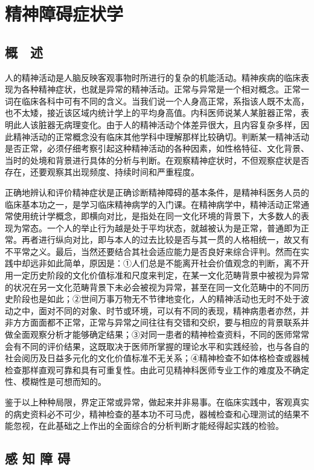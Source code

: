 \chapter{精神障碍症状学}

\section{概　述}

人的精神活动是人脑反映客观事物时所进行的复杂的机能活动。精神疾病的临床表现为各种精神症状，也就是异常的精神活动。正常与异常是一个相对概念。正常一词在临床各科中可有不同的含义。当我们说一个人身高正常，系指该人既不太高，也不太矮，接近该区域内统计学上的平均身高值。内科医师说某人某脏器正常，表明此人该脏器无病理变化。由于人的精神活动个体差异很大，且内容复杂多样，因此精神活动的正常概念没有临床其他学科中理解那样比较确切。判断某一精神活动是否正常，必须仔细考察引起这种精神活动的各种因素，如性格特征、文化背景、当时的处境和背景进行具体的分析与判断。在观察精神症状时，不但观察症状是否存在，还要观察其出现频度、持续时间和严重程度。

正确地辨认和评价精神症状是正确诊断精神障碍的基本条件，是精神科医务人员的临床基本功之一，是学习临床精神病学的入门课。在精神病学中，精神活动正常通常使用统计学概念，即横向对比，是指处在同一文化环境的背景下，大多数人的表现为常态。一个人的举止行为越是处于平均状态，就越被认为是正常，普通即为正常。再者进行纵向对比，即与本人的过去比较是否与其一贯的人格相统一，故又有不平常之义。最后，当然还要结合其社会适应能力是否良好来综合评判。然而在实践中却远非如此简单，原因是：①人们总是不能离开社会价值观念的判断，离不开用一定历史阶段的文化价值标准和尺度来判定，在某一文化范畴背景中被视为异常的状况在另一文化范畴背景下未必会被视为异常，甚至在同一文化范畴中的不同历史阶段也是如此；②世间万事万物无不节律地变化，人的精神活动也无时不处于波动之中，面对不同的对象、时节或环境，可以有不同的表现，精神病患者亦然，并非方方面面都不正常，正常与异常之间往往有交错和交织，要与相应的背景联系并做全面观察分析才能够确定结果；③对同一患者的精神检查资料，不同的医师常常会有不同的评价结果，这既取决于医师所掌握的理论水平和实践经验，也与各自的社会阅历及日益多元化的文化价值标准不无关系；④精神检查不如体格检查或器械检查那样直观可靠和具有可重复性。由此可见精神科医师专业工作的难度及不确定性、模糊性是可想而知的。

鉴于以上种种局限，界定正常或异常，做起来并非易事。在临床实践中，客观真实的病史资料必不可少，精神检查的基本功不可马虎，器械检查和心理测试的结果不能忽视，在此基础之上作出的全面综合的分析判断才能经得起实践的检验。

\section{感 知 障 碍}

